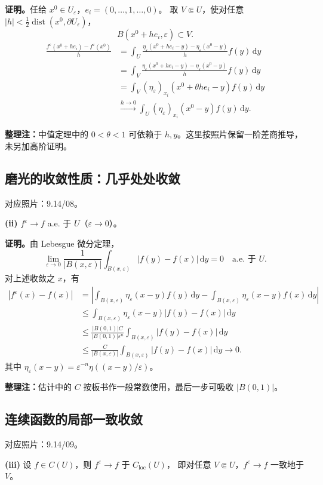 \documentclass[UTF8,a4paper,11pt,fontset=fandol]{ctexart}
\newcommand{\dd}{\,\mathrm d}
\newcommand{\ednote}[1]{\par{\small\color{notegray}\textbf{整理注：}#1}\par}
\newcommand{\source}[1]{{\small\color{notegray}对应照片：#1。}\par}
\begin{document}
\textbf{证明。}任给 $x^0\in U_\varepsilon$，$e_i=(0,\ldots,1,\ldots,0)$。
取 $V\Subset U$，使对任意 $|h|<\frac12\operatorname{dist}(x^0,\partial U_\varepsilon)$，
\[
B(x^0+he_i,\varepsilon)\subset V.
\]
\[
\begin{aligned}
\frac{f^\varepsilon(x^0+he_i)-f^\varepsilon(x^0)}h
&=\int_U\frac{\eta_\varepsilon(x^0+he_i-y)-\eta_\varepsilon(x^0-y)}h f(y)\dd y\\
&=\int_V\frac{\eta_\varepsilon(x^0+he_i-y)-\eta_\varepsilon(x^0-y)}h f(y)\dd y\\
&=\int_V(\eta_\varepsilon)_{x_i}(x^0+\theta he_i-y)f(y)\dd y\\
&\xrightarrow{h\to0}\int_U(\eta_\varepsilon)_{x_i}(x^0-y)f(y)\dd y.
\end{aligned}
\]
\ednote{中值定理中的 $0<\theta<1$ 可依赖于 $h,y$。这里按照片保留一阶差商推导，未另加高阶证明。}

\newpage
\subsection*{磨光的收敛性质：几乎处处收敛}
\source{9.14/08}
\textbf{(ii)} $f^\varepsilon\to f$ a.e. 于 $U$（$\varepsilon\to0$）。

\textbf{证明。}由 Lebesgue 微分定理，
\[
\lim_{\varepsilon\to0}\frac1{|B(x,\varepsilon)|}
\int_{B(x,\varepsilon)}|f(y)-f(x)|\dd y=0
\quad\text{a.e. 于 }U.
\]
对上述收敛之 $x$，有
\[
\begin{aligned}
|f^\varepsilon(x)-f(x)|
&=\left|\int_{B(x,\varepsilon)}\eta_\varepsilon(x-y)f(y)\dd y
-\int_{B(x,\varepsilon)}\eta_\varepsilon(x-y)f(x)\dd y\right|\\
&\leq\int_{B(x,\varepsilon)}\eta_\varepsilon(x-y)|f(y)-f(x)|\dd y\\
&\leq\frac{|B(0,1)|C}{|B(0,1)|\varepsilon^n}
\int_{B(x,\varepsilon)}|f(y)-f(x)|\dd y\\
&\leq\frac C{|B(x,\varepsilon)|}
\int_{B(x,\varepsilon)}|f(y)-f(x)|\dd y\longrightarrow0.
\end{aligned}
\]
其中 $\eta_\varepsilon(x-y)=\varepsilon^{-n}\eta((x-y)/\varepsilon)$。
\ednote{估计中的 $C$ 按板书作一般常数使用，最后一步可吸收 $|B(0,1)|$。}

\subsection*{连续函数的局部一致收敛}
\source{9.14/09}
\textbf{(iii)} 设 $f\in C(U)$，则 $f^\varepsilon\to f$ 于 $C_{\mathrm{loc}}(U)$，
即对任意 $V\Subset U$，$f^\varepsilon\to f$ 一致地于 $V$。
\end{document}
